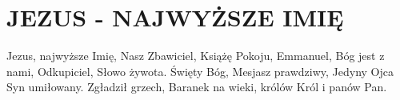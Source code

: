 \documentclass[../../../songbook.tex]{subfiles}
\begin{document}
\TabPositions{8cm} %
\section*{JEZUS - NAJWYŻSZE IMIĘ}
{}
\vspace{0.5cm}
Jezus, najwyższe Imię,				 \newline	
Nasz Zbawiciel, Książę Pokoju,		 \newline	
Emmanuel, Bóg jest z nami,			 \newline	
Odkupiciel, Słowo żywota.			 \newline	
Święty Bóg, Mesjasz prawdziwy,		 \newline	
Jedyny Ojca Syn umiłowany.			 \newline	
Zgładził grzech, Baranek na wieki,	 \newline	
królów Król i panów Pan.			 \newline	
\end{document}
